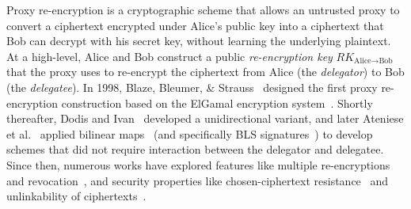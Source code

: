 %
%
Proxy re-encryption is a cryptographic scheme that allows an untrusted
proxy to convert a ciphertext encrypted under Alice's public key into a
ciphertext that Bob can decrypt with his secret key, without learning the
underlying plaintext.
%
At a high-level, Alice and Bob construct a public \emph{re-encryption key}
$RK_{\text{Alice}\rightarrow\text{Bob}}$ that
the proxy uses to re-encrypt the ciphertext from Alice (the \emph{delegator}) to Bob
(the \emph{delegatee}).
%
In 1998, Blaze, Bleumer, \& Strauss~\cite{98-eurocrypt-proxy_cryptography}
designed the first proxy re-encryption construction based on the ElGamal
encryption system~\cite{85-toit-elgamal}.
%
Shortly thereafter, Dodis and Ivan~\cite{03-ndss-proxy_cryptography_revisited}
developed a unidirectional variant, and later Ateniese et
al.~\cite{05-ndss-improved_proxy_reencryption} applied bilinear
maps~\cite{01-crypto-ibe_weil_pairing} (and specifically BLS
signatures~\cite{03-eurocrypt-aggregate_signatures_bilinear_maps}) to develop
schemes that did not require interaction between the delegator and delegatee.
%
Since then, numerous works have explored features like multiple
re-encryptions~\cite{17-tops-fast_proxy_re_encryption} and
revocation~\cite{12-crypto-dynamic_credentials_and_delegation_for_abe}, and
security properties like chosen-ciphertext
resistance~\cite{07-ccs-cca_proxy_re_encryption} and
unlinkability of ciphertexts~\cite{19-acisp-pcs_proxy_reencryption}.
